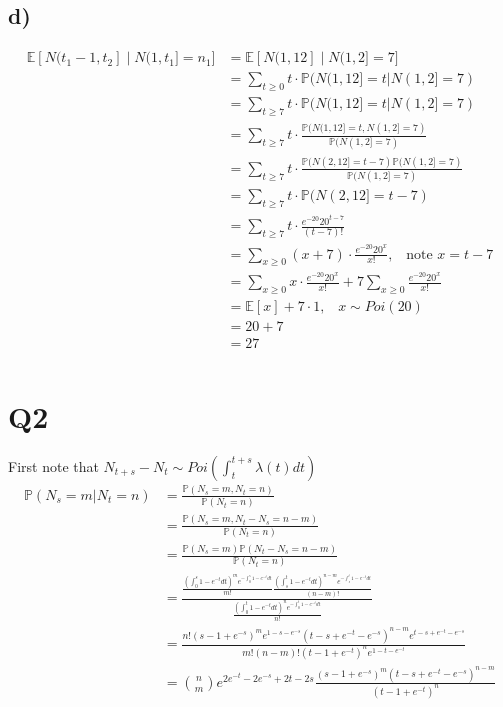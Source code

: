 \documentclass{article}
\begin{document}
\subsection*{d)}
\begin{align*}
\mathbb{E}[N(t_1-1,t_2]\;|\;N(1,t_1]=n_1]&=\mathbb{E}[N(1,12]\;|\;N(1,2]=7]\\
&=\sum_{t\geq0}t\cdot\mathbb{P}(N(1,12]=t|N(1,2]=7)\\
&=\sum_{t\geq7}t\cdot\mathbb{P}(N(1,12]=t|N(1,2]=7)\\
&=\sum_{t\geq7}t\cdot\frac{\mathbb{P}(N(1,12]=t,N(1,2]=7)}{\mathbb{P}(N(1,2]=7)}\\
&=\sum_{t\geq7}t\cdot\frac{\mathbb{P}(N(2,12]=t-7)\mathbb{P}(N(1,2]=7)}{\mathbb{P}(N(1,2]=7)}\\
&=\sum_{t\geq7}t\cdot\mathbb{P}(N(2,12]=t-7)\\
&=\sum_{t\geq7}t\cdot\frac{e^{-20}20^{t-7}}{(t-7)!}\\
&=\sum_{x\geq0}(x+7)\cdot\frac{e^{-20}20^{x}}{x!},\;\;\;\text{note }x=t-7\\
&=\sum_{x\geq0}x\cdot\frac{e^{-20}20^{x}}{x!}+7\sum_{x\geq0}\frac{e^{-20}20^{x}}{x!}\\
&=\mathbb{E}[x]+7\cdot1,\;\;\;x\sim Poi(20)\\
&=20+7\\
&=27\\
\end{align*}
\section*{Q2}
First note that $N_{t+s}-N_{t}\sim Poi\left(\int_{t}^{t+s}\lambda(t)dt\right)$
\begin{align*}
\mathbb{P}(N_{s}=m|N_{t}=n)&=\frac{\mathbb{P}(N_{s}=m,N_{t}=n)}{\mathbb{P}(N_{t}=n)}\\
&=\frac{\mathbb{P}(N_{s}=m,N_{t}-N_{s}=n-m)}{\mathbb{P}(N_{t}=n)}\\
&=\frac{\mathbb{P}(N_{s}=m)\mathbb{P}(N_{t}-N_{s}=n-m)}{\mathbb{P}(N_{t}=n)}\\
&=\frac{\frac{\left(\int_{0}^{s}1-e^{-t}dt\right)^me^{-\int_{0}^{s}1-e^{-t}dt}}{m!}\frac{\left(\int_{s}^{t}1-e^{-t}dt\right)^{n-m}e^{-\int_{s}^{t}1-e^{-t}dt}}{(n-m)!}}{\frac{\left(\int_{0}^{t}1-e^{-t}dt\right)^ne^{-\int_{0}^{t}1-e^{-t}dt}}{n!}}\\
&=\frac{n!(s-1+e^{-s})^me^{1-s-e^{-s}}(t-s+e^{-t}-e^{-s})^{n-m}e^{t-s+e^{-t}-e^{-s}}}{m!(n-m)!(t-1+e^{-t})^ne^{1-t-e^{-t}}}\\
&={n\choose m}e^{2e^{-t}-2e^{-s}+2t-2s}\frac{(s-1+e^{-s})^m(t-s+e^{-t}-e^{-s})^{n-m}}{(t-1+e^{-t})^n}\\
\end{align*}
\end{document}
